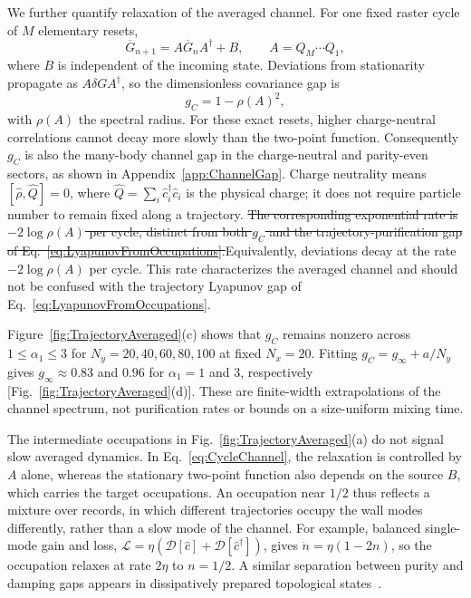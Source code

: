 \documentclass[aps,prb,10pt,twocolumn,superscriptaddress,longbibliography,floatfix]{revtex4-2}
\newcommand{\mc}[1]{\mathcal{#1}}
\newcommand{\newtext}[1]{{\color{blue}#1}}
\newcommand{\claudeadd}[1]{{\color{orange}#1}}
\newcommand{\claudedel}[1]{{\color{orange}\sout{#1}}}
\begin{document}
{\color{blue}
We further quantify relaxation of the averaged channel. For one fixed raster cycle of $M$ elementary resets,
\begin{equation}
 \overline G_{n+1}=A\overline G_nA^\dagger+B,\qquad A=Q_M\cdots Q_1,
 \label{eq:CycleChannel}
\end{equation}
where $B$ is independent of the incoming state. Deviations from stationarity propagate as $A\delta G A^\dagger$, so the dimensionless covariance gap is
\begin{equation}
 g_C=1-\rho(A)^2,
 \label{eq:ChannelGap}
\end{equation}
with $\rho(A)$ the spectral radius. For these exact resets, higher charge-neutral correlations cannot decay more slowly than the two-point function. Consequently $g_C$ is also the many-body channel gap in the charge-neutral and parity-even sectors, as shown in Appendix~\ref{app:ChannelGap}. Charge neutrality means $[\hat\rho,\hat Q]=0$, where $\hat Q=\sum_i\hat c_i^\dagger\hat c_i$ is the physical charge; it does not require particle number to remain fixed along a trajectory. \claudedel{The corresponding exponential rate is $-2\log\rho(A)$ per cycle, distinct from both $g_C$ and the trajectory-purification gap of Eq.~\eqref{eq:LyapunovFromOccupations}.}\claudeadd{Equivalently, deviations decay at the rate $-2\log\rho(A)$ per cycle. This rate characterizes the averaged channel and should not be confused with the trajectory Lyapunov gap of Eq.~\eqref{eq:LyapunovFromOccupations}.}

Figure~\ref{fig:TrajectoryAveraged}(c) shows that $g_C$ remains nonzero across $1\leq\alpha_1\leq3$ for $N_y=20,40,60,80,100$ at fixed $N_x=20$. Fitting $g_C=g_\infty+a/N_y$ gives $g_\infty\approx0.83$ and $0.96$ for $\alpha_1=1$ and $3$, respectively [Fig.~\ref{fig:TrajectoryAveraged}(d)]. These are finite-width extrapolations of the channel spectrum, not purification rates or bounds on a size-uniform mixing time.

\claudeadd{The intermediate occupations in Fig.~\ref{fig:TrajectoryAveraged}(a) do not signal slow averaged dynamics. In Eq.~\eqref{eq:CycleChannel}, the relaxation is controlled by $A$ alone, whereas the stationary two-point function also depends on the source $B$, which carries the target occupations. An occupation near $1/2$ thus reflects a mixture over records, in which different trajectories occupy the wall modes differently, rather than a slow mode of the channel. \newtext{For example, balanced single-mode gain and loss, $\mc L=\eta(\mc D[\hat c]+\mc D[\hat c^\dagger])$, gives $\dot n=\eta(1-2n)$, so the occupation relaxes at rate $2\eta$ to $n=1/2$.} A similar separation between purity and damping gaps appears in dissipatively prepared topological states~\cite{BardynEtAl2013}.}

}
\end{document}
